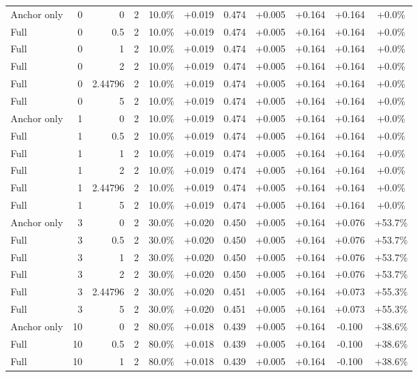 \begin{table}[htbp]
\begin{tabular}{lrrrccccccc}
Anchor only & 0 & 0 & 2 & 10.0\% & +0.019 & 0.474 & +0.005 & +0.164 & +0.164 & +0.0\% \\
Full & 0 & 0.5 & 2 & 10.0\% & +0.019 & 0.474 & +0.005 & +0.164 & +0.164 & +0.0\% \\
Full & 0 & 1 & 2 & 10.0\% & +0.019 & 0.474 & +0.005 & +0.164 & +0.164 & +0.0\% \\
Full & 0 & 2 & 2 & 10.0\% & +0.019 & 0.474 & +0.005 & +0.164 & +0.164 & +0.0\% \\
Full & 0 & 2.44796 & 2 & 10.0\% & +0.019 & 0.474 & +0.005 & +0.164 & +0.164 & +0.0\% \\
Full & 0 & 5 & 2 & 10.0\% & +0.019 & 0.474 & +0.005 & +0.164 & +0.164 & +0.0\% \\
Anchor only & 1 & 0 & 2 & 10.0\% & +0.019 & 0.474 & +0.005 & +0.164 & +0.164 & +0.0\% \\
Full & 1 & 0.5 & 2 & 10.0\% & +0.019 & 0.474 & +0.005 & +0.164 & +0.164 & +0.0\% \\
Full & 1 & 1 & 2 & 10.0\% & +0.019 & 0.474 & +0.005 & +0.164 & +0.164 & +0.0\% \\
Full & 1 & 2 & 2 & 10.0\% & +0.019 & 0.474 & +0.005 & +0.164 & +0.164 & +0.0\% \\
Full & 1 & 2.44796 & 2 & 10.0\% & +0.019 & 0.474 & +0.005 & +0.164 & +0.164 & +0.0\% \\
Full & 1 & 5 & 2 & 10.0\% & +0.019 & 0.474 & +0.005 & +0.164 & +0.164 & +0.0\% \\
Anchor only & 3 & 0 & 2 & 30.0\% & +0.020 & 0.450 & +0.005 & +0.164 & +0.076 & +53.7\% \\
Full & 3 & 0.5 & 2 & 30.0\% & +0.020 & 0.450 & +0.005 & +0.164 & +0.076 & +53.7\% \\
Full & 3 & 1 & 2 & 30.0\% & +0.020 & 0.450 & +0.005 & +0.164 & +0.076 & +53.7\% \\
Full & 3 & 2 & 2 & 30.0\% & +0.020 & 0.450 & +0.005 & +0.164 & +0.076 & +53.7\% \\
Full & 3 & 2.44796 & 2 & 30.0\% & +0.020 & 0.451 & +0.005 & +0.164 & +0.073 & +55.3\% \\
Full & 3 & 5 & 2 & 30.0\% & +0.020 & 0.451 & +0.005 & +0.164 & +0.073 & +55.3\% \\
Anchor only & 10 & 0 & 2 & 80.0\% & +0.018 & 0.439 & +0.005 & +0.164 & -0.100 & +38.6\% \\
Full & 10 & 0.5 & 2 & 80.0\% & +0.018 & 0.439 & +0.005 & +0.164 & -0.100 & +38.6\% \\
Full & 10 & 1 & 2 & 80.0\% & +0.018 & 0.439 & +0.005 & +0.164 & -0.100 & +38.6\% \\

\end{tabular}
\end{table}
